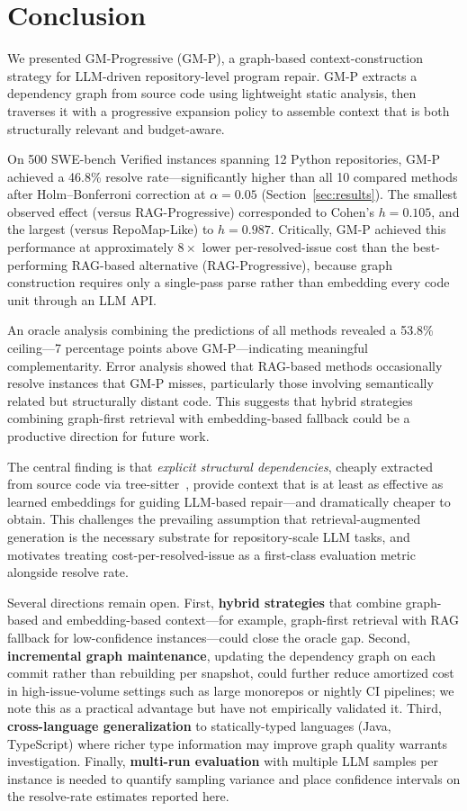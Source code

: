 \section{Conclusion}
\label{sec:conclusion}

We presented GM-Progressive (GM-P), a graph-based context-construction strategy for LLM-driven repository-level program repair.
GM-P extracts a dependency graph from source code using lightweight static analysis, then traverses it with a progressive expansion policy to assemble context that is both structurally relevant and budget-aware.

On 500 SWE-bench Verified instances spanning 12 Python repositories, GM-P achieved a 46.8\% resolve rate---significantly higher than all 10 compared methods after Holm--Bonferroni correction at $\alpha = 0.05$ (Section~\ref{sec:results}).
The smallest observed effect (versus RAG-Progressive) corresponded to Cohen's $h = 0.105$, and the largest (versus RepoMap-Like) to $h = 0.987$.
Critically, GM-P achieved this performance at approximately $8\times$ lower per-resolved-issue cost than the best-performing RAG-based alternative (RAG-Progressive), because graph construction requires only a single-pass parse rather than embedding every code unit through an LLM API.

An oracle analysis combining the predictions of all methods revealed a 53.8\% ceiling---7 percentage points above GM-P---indicating meaningful complementarity.
Error analysis showed that RAG-based methods occasionally resolve instances that GM-P misses, particularly those involving semantically related but structurally distant code.
This suggests that hybrid strategies combining graph-first retrieval with embedding-based fallback could be a productive direction for future work.

The central finding is that \emph{explicit structural dependencies}, cheaply extracted from source code via tree-sitter~\cite{treesitter}, provide context that is at least as effective as learned embeddings for guiding LLM-based repair---and dramatically cheaper to obtain.
This challenges the prevailing assumption that retrieval-augmented generation is the necessary substrate for repository-scale LLM tasks, and motivates treating cost-per-resolved-issue as a first-class evaluation metric alongside resolve rate.

Several directions remain open.
First, \textbf{hybrid strategies} that combine graph-based and embedding-based context---for example, graph-first retrieval with RAG fallback for low-confidence instances---could close the oracle gap.
Second, \textbf{incremental graph maintenance}, updating the dependency graph on each commit rather than rebuilding per snapshot, could further reduce amortized cost in high-issue-volume settings such as large monorepos or nightly CI pipelines; we note this as a practical advantage but have not empirically validated it.
Third, \textbf{cross-language generalization} to statically-typed languages (Java, TypeScript) where richer type information may improve graph quality warrants investigation.
Finally, \textbf{multi-run evaluation} with multiple LLM samples per instance is needed to quantify sampling variance and place confidence intervals on the resolve-rate estimates reported here.

